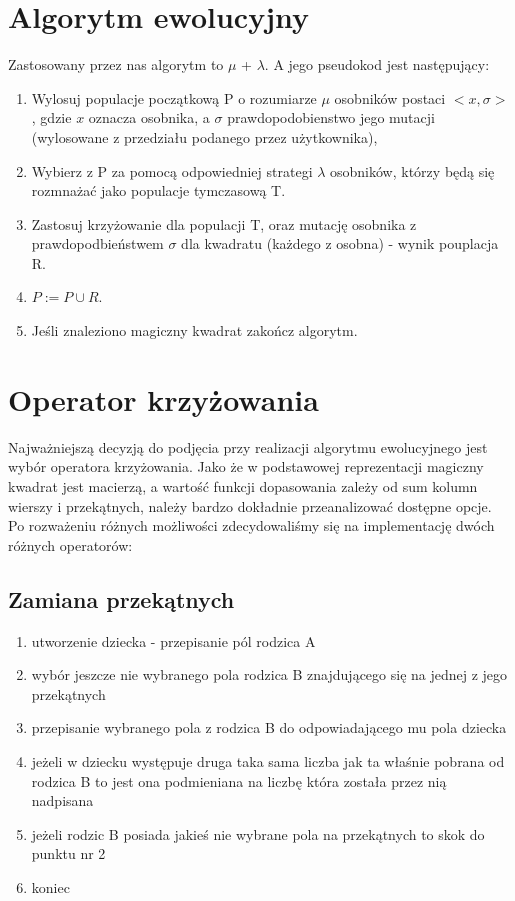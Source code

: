 \documentclass[a4paper,twoside,10pt]{article}
\begin{document}
\section{Algorytm ewolucyjny}
Zastosowany przez nas algorytm to $\mu$ +  $\lambda$. A jego pseudokod jest następujący:
		\begin{enumerate}
			\item Wylosuj populacje początkową P o rozumiarze $\mu$ osobników postaci $<x,\sigma>$, gdzie $x$ oznacza osobnika, a $\sigma$ prawdopodobienstwo jego mutacji (wylosowane z przedziału podanego przez użytkownika),
			\item Wybierz z P za pomocą odpowiedniej strategi $\lambda$ osobników, którzy będą się rozmnażać jako populacje tymczasową T.
			\item Zastosuj krzyżowanie dla populacji T, oraz mutację osobnika z prawdopodbieństwem $\sigma$  dla kwadratu (każdego z osobna) - wynik pouplacja R.
			\item $P := P \cup R$.
			\item Jeśli znaleziono magiczny kwadrat zakończ algorytm.
		\end{enumerate}
\section{Operator krzyżowania}
	Najważniejszą decyzją do podjęcia przy realizacji algorytmu ewolucyjnego jest wybór operatora krzyżowania. Jako że w podstawowej reprezentacji magiczny kwadrat jest macierzą, a wartość funkcji dopasowania zależy od sum kolumn wierszy i przekątnych, należy bardzo dokładnie przeanalizować dostępne opcje. Po rozważeniu różnych możliwości zdecydowaliśmy się na implementację dwóch różnych operatorów:
		\subsection{Zamiana przekątnych}
		\begin{enumerate}
			\item utworzenie dziecka - przepisanie pól rodzica A
			\item wybór jeszcze nie wybranego pola rodzica B znajdującego się na jednej z jego przekątnych
			\item przepisanie wybranego pola z rodzica B do odpowiadającego mu pola dziecka
			\item jeżeli w dziecku występuje druga taka sama liczba jak ta właśnie pobrana od rodzica B to jest ona podmieniana na liczbę która została przez nią nadpisana
			\item jeżeli rodzic B posiada jakieś nie wybrane pola na przekątnych to skok do punktu nr 2
			\item koniec
		\end{enumerate}
\end{document}
